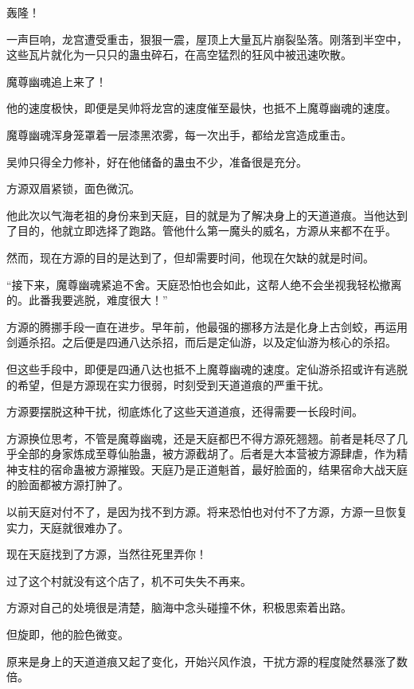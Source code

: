 
\begin{this_body}

轰隆！

一声巨响，龙宫遭受重击，狠狠一震，屋顶上大量瓦片崩裂坠落。刚落到半空中，这些瓦片就化为一只只的蛊虫碎石，在高空猛烈的狂风中被迅速吹散。

魔尊幽魂追上来了！

他的速度极快，即便是吴帅将龙宫的速度催至最快，也抵不上魔尊幽魂的速度。

魔尊幽魂浑身笼罩着一层漆黑浓雾，每一次出手，都给龙宫造成重击。

吴帅只得全力修补，好在他储备的蛊虫不少，准备很是充分。

方源双眉紧锁，面色微沉。

他此次以气海老祖的身份来到天庭，目的就是为了解决身上的天道道痕。当他达到了目的，他就立即选择了跑路。管他什么第一魔头的威名，方源从来都不在乎。

然而，现在方源的目的是达到了，但却需要时间，他现在欠缺的就是时间。

“接下来，魔尊幽魂紧追不舍。天庭恐怕也会如此，这帮人绝不会坐视我轻松撤离的。此番我要逃脱，难度很大！”

方源的腾挪手段一直在进步。早年前，他最强的挪移方法是化身上古剑蛟，再运用剑遁杀招。之后便是四通八达杀招，而后是定仙游，以及定仙游为核心的杀招。

但这些手段中，即便是四通八达也抵不上魔尊幽魂的速度。定仙游杀招或许有逃脱的希望，但是方源现在实力很弱，时刻受到天道道痕的严重干扰。

方源要摆脱这种干扰，彻底炼化了这些天道道痕，还得需要一长段时间。

方源换位思考，不管是魔尊幽魂，还是天庭都巴不得方源死翘翘。前者是耗尽了几乎全部的身家炼成至尊仙胎蛊，被方源截胡了。后者是大本营被方源肆虐，作为精神支柱的宿命蛊被方源摧毁。天庭乃是正道魁首，最好脸面的，结果宿命大战天庭的脸面都被方源打肿了。

以前天庭对付不了，是因为找不到方源。将来恐怕也对付不了方源，方源一旦恢复实力，天庭就很难办了。

现在天庭找到了方源，当然往死里弄你！

过了这个村就没有这个店了，机不可失失不再来。

方源对自己的处境很是清楚，脑海中念头碰撞不休，积极思索着出路。

但旋即，他的脸色微变。

原来是身上的天道道痕又起了变化，开始兴风作浪，干扰方源的程度陡然暴涨了数倍。


\end{this_body}
